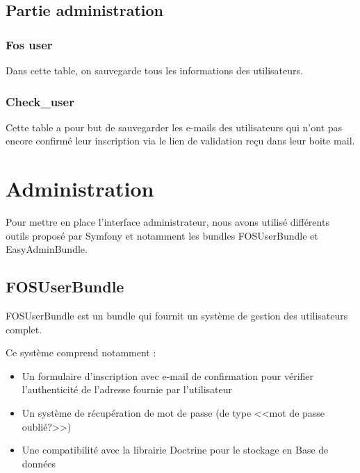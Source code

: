 \subsection{Partie administration}

\subsubsection{Fos user}

\par Dans cette table, on sauvegarde tous les informations des utilisateurs.

\subsubsection{Check\_user}

Cette table a pour but de sauvegarder les e-mails des utilisateurs qui n’ont pas encore confirmé leur inscription via le lien de validation reçu dans leur boite mail. 

\section{Administration}

\par Pour mettre en place l’interface administrateur, nous avons utilisé différents outils proposé par Symfony et notamment les bundles FOSUserBundle et EasyAdminBundle.

\subsection{FOSUserBundle}

\par FOSUserBundle est un bundle qui fournit un système de gestion des utilisateurs complet. \\

\par Ce système comprend notamment :

\begin{itemize}
	\item Un formulaire d’inscription avec e-mail de confirmation pour vérifier l'authenticité de l’adresse fournie par l'utilisateur
	\item Un système de récupération de mot de passe (de type <<mot de passe oublié?>>)
	\item Une compatibilité avec la librairie Doctrine pour le stockage en Base de données

\end{itemize}


